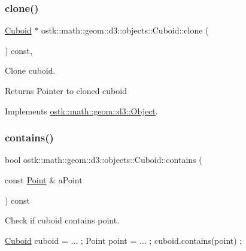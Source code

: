 \subsubsection{\texorpdfstring{clone()}{clone()}}
{\footnotesize\ttfamily \hyperlink{classostk_1_1math_1_1geom_1_1d3_1_1objects_1_1_cuboid}{Cuboid} $\ast$ ostk\+::math\+::geom\+::d3\+::objects\+::\+Cuboid\+::clone (\begin{DoxyParamCaption}{ }\end{DoxyParamCaption}) const\hspace{0.3cm}{\ttfamily [override]}, {\ttfamily [virtual]}}



Clone cuboid. 

\begin{DoxyReturn}{Returns}
Pointer to cloned cuboid 
\end{DoxyReturn}


Implements \hyperlink{classostk_1_1math_1_1geom_1_1d3_1_1_object_a676013f9555f6492687f9809b2db887b}{ostk\+::math\+::geom\+::d3\+::\+Object}.

\mbox{\label{classostk_1_1math_1_1geom_1_1d3_1_1objects_1_1_cuboid_ac6e3f399ced96b348cb954a2ff0314fd}} 
\subsubsection{\texorpdfstring{contains()}{contains()}\hspace{0.1cm}{\footnotesize\ttfamily [1/3]}}
{\footnotesize\ttfamily bool ostk\+::math\+::geom\+::d3\+::objects\+::\+Cuboid\+::contains (\begin{DoxyParamCaption}\item[{const \hyperlink{classostk_1_1math_1_1geom_1_1d3_1_1objects_1_1_point}{Point} \&}]{a\+Point }\end{DoxyParamCaption}) const}



Check if cuboid contains point. 


\begin{DoxyCode}
\hyperlink{classostk_1_1math_1_1geom_1_1d3_1_1objects_1_1_cuboid_a1da071d7cbb0a694348628f098f77c5b}{Cuboid} cuboid = ... ;
Point point = ... ;
cuboid.contains(point) ;
\end{DoxyCode}



